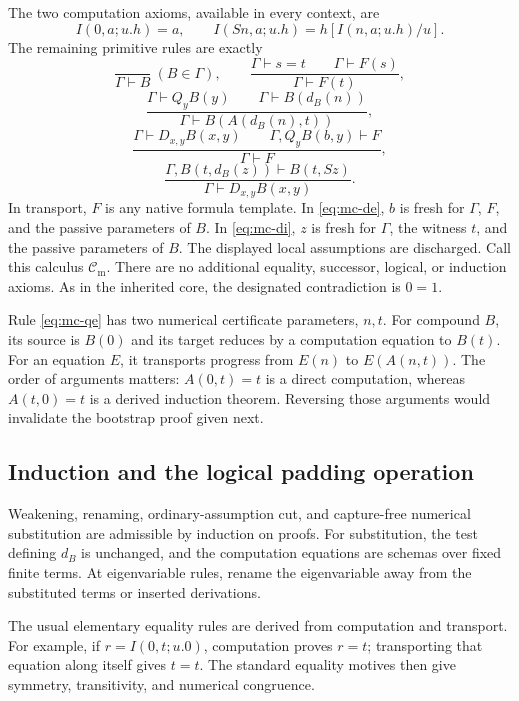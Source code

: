 The two computation axioms, available in every context, are
\[
 I(0,a;u.h)=a,\qquad
 I(Sn,a;u.h)=h[I(n,a;u.h)/u].
 \tag{MC2}\label{eq:mc-comp}
\]
The remaining primitive rules are exactly
\[
 \frac{}{\Gamma\vdash B}\ (B\in\Gamma),
 \qquad
 \frac{\Gamma\vdash s=t\qquad\Gamma\vdash F(s)}
      {\Gamma\vdash F(t)},
 \tag{MC3}\label{eq:mc-hyp-tr}
\]
\[
 \frac{\Gamma\vdash Q_yB(y)\qquad
       \Gamma\vdash B(d_B(n))}
      {\Gamma\vdash B(A(d_B(n),t))},
 \tag{MC4}\label{eq:mc-qe}
\]
\[
 \frac{\Gamma\vdash D_{x,y}B(x,y)\qquad
       \Gamma,Q_yB(b,y)\vdash F}
      {\Gamma\vdash F},
 \tag{MC5}\label{eq:mc-de}
\]
\[
 \frac{\Gamma,B(t,d_B(z))\vdash B(t,Sz)}
      {\Gamma\vdash D_{x,y}B(x,y)}.
 \tag{MC6}\label{eq:mc-di}
\]
In transport, $F$ is any native formula template.  In
\eqref{eq:mc-de}, $b$ is fresh for $\Gamma$, $F$, and the passive
parameters of $B$.  In \eqref{eq:mc-di}, $z$ is fresh for $\Gamma$,
the witness $t$, and the passive parameters of $B$.  The displayed local
assumptions are discharged.  Call this calculus $\mathcal C_{\mathrm m}$.
There are no additional equality, successor, logical, or induction axioms.
As in the inherited core, the designated contradiction is $0=1$.

Rule \eqref{eq:mc-qe} has two numerical certificate parameters, $n,t$.
For compound $B$, its source is $B(0)$ and its target reduces by a
computation equation to $B(t)$.  For an equation $E$, it transports
progress from $E(n)$ to $E(A(n,t))$.  The order of arguments matters:
$A(0,t)=t$ is a direct computation, whereas $A(t,0)=t$ is a derived
induction theorem.  Reversing those arguments would invalidate the
bootstrap proof given next.

\subsection{Induction and the logical padding operation}

Weakening, renaming, ordinary-assumption cut, and capture-free numerical
substitution are admissible by induction on proofs.  For substitution,
the test defining $d_B$ is unchanged, and the computation equations are
schemas over fixed finite terms.  At eigenvariable rules, rename the
eigenvariable away from the substituted terms or inserted derivations.

The usual elementary equality rules are derived from computation and
transport.  For example, if $r=I(0,t;u.0)$, computation proves $r=t$;
transporting that equation along itself gives $t=t$.  The standard
equality motives then give symmetry, transitivity, and numerical congruence.


